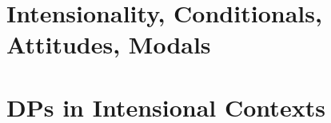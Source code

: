 \documentclass{kvf-lecturenotes}
\begin{document}
\dominitoc



\mainmatter

\pagestyle{kaiheadings}

\part{Intensionality, Conditionals, Attitudes, Modals}

 




\part{DPs in Intensional Contexts}



\printbibliography
 
\end{document}
